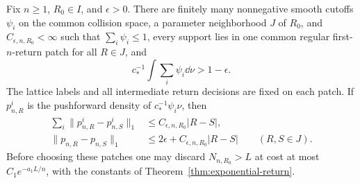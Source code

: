 \begin{proposition}
\label{prop:finite-common-patches}
Fix $n\ge1$, $R_0\in I$, and $\epsilon>0$. There are finitely many
nonnegative smooth cutoffs $\psi_i$ on the common collision space, a
parameter neighborhood $J$ of $R_0$, and $C_{\epsilon,n,R_0}<\infty$
such that $\sum_i\psi_i\le1$, every support lies in one common regular
first-$n$-return patch for all $R\in J$, and
\begin{equation}\label{eq:common-patch-mass}
 c_*^{-1}\int\sum_i\psi_i\dd\nu>1-\epsilon.
\end{equation}
The lattice labels and all intermediate return decisions are fixed on
each patch. If $p^i_{n,R}$ is the pushforward density of
$c_*^{-1}\psi_i\nu$, then
\begin{align}\label{eq:common-patch-bound}
 \sum_i\|p^i_{n,R}-p^i_{n,S}\|_1
       &\le C_{\epsilon,n,R_0}|R-S|,\\
 \|p_{n,R}-p_{n,S}\|_1
       &\le2\epsilon+C_{\epsilon,n,R_0}|R-S|
               \qquad(R,S\in J).\nonumber
\end{align}
Before choosing these patches one may discard $N_{n,R_0}>L$ at cost at
most $C_1e^{-a_1L/n}$, with the constants of
Theorem~\ref{thm:exponential-return}.
\end{proposition}
